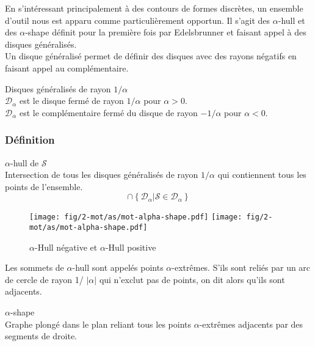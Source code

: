 En s'intéressant principalement à des contours de formes discrètes, un ensemble d'outil nous est apparu comme particulièrement opportun. Il s'agit des $\alpha$-hull et des $\alpha$-shape définit pour la première fois par Edelsbrunner \cite{EdeKirSei83} et faisant appel à des disques généralisés.\\

Un disque généralisé permet de définir des disques avec des rayons négatifs en faisant appel au complémentaire.

\begin{Definition}{Disques généralisés de rayon $1/\alpha$}\\
\label{def:dis-gen}
   $\mathcal{D}_{\alpha}$ est le disque fermé de rayon $1/\alpha$ pour $\alpha > 0$.\\
   $\mathcal{D}_{\alpha}$ est le complémentaire fermé du disque de rayon $- 1/\alpha$ pour $\alpha < 0$.
\end{Definition}

\subsubsection{Définition}

\begin{Definition}{$\alpha$-hull de $\mathcal{S}$}\\
\label{def:ah-txt}
    Intersection de tous les disques généralisés de rayon $1/\alpha$ qui contiennent tous les points de l'ensemble.
    $$\cap \left\{ \mathcal{D}_{\alpha} | \mathcal{S} \in \mathcal{D}_{\alpha} \right\}$$
\end{Definition}

\begin{figure}[h!]
  \centering
  \texttt{[image: fig/2-mot/as/mot-alpha-shape.pdf]}
  \texttt{[image: fig/2-mot/as/mot-alpha-shape.pdf]}
  \caption{$\alpha$-Hull négative et $\alpha$-Hull positive }
\end{figure}
  

Les sommets de $\alpha$-hull sont appelés points $\alpha$-extrêmes. S'ils sont reliés par un arc de cercle de rayon 1/ $\lvert \alpha \rvert$ qui n'exclut pas de points, on dit alors qu'ils sont adjacents.

\begin{Definition}{$\alpha$-shape}\\
\label{def:as}
      Graphe plongé dans le plan reliant tous les points $\alpha$-extrêmes adjacents par des segments de droite.
\end{Definition}


